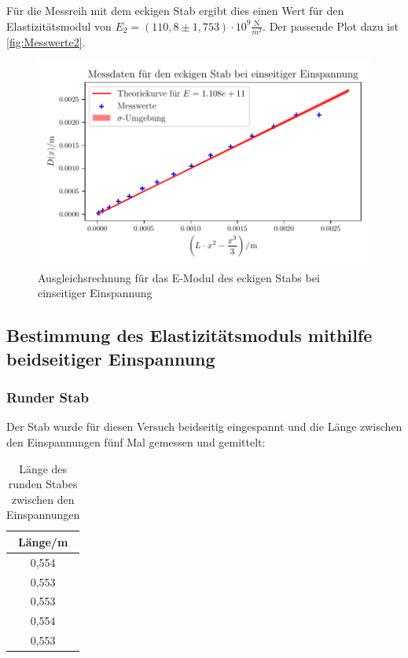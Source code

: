   Für die Messreih mit dem eckigen Stab ergibt dies einen Wert für den Elastizitätsmodul von $E_2 = (110{,}8 \pm 1{,}753) \cdot \mathrm{10^{9}} \frac{\mathrm{N}}{m^2}$. Der passende Plot dazu ist
  \autoref{fig:Messwerte2}.

  \begin{figure}
    \centering
    \includegraphics{build/plot3.pdf}
    \caption{Ausgleichsrechnung für das E-Modul des eckigen Stabs bei einseitiger Einspannung}
    \label{fig:Messwerte2}
  \end{figure}
  \newpage

\subsection{Bestimmung des Elastizitätsmoduls mithilfe beidseitiger Einspannung}

\subsubsection{Runder Stab}
  Der Stab wurde für diesen Versuch beidseitig eingespannt und die Länge zwischen den Einspannungen fünf Mal gemessen und gemittelt:

  \begin{table}
    \centering
    \caption{Länge des runden Stabes zwischen den Einspannungen}
    \label{tab:beidseitig_runder_Laenge}
    \begin{tabular}{c}
      \toprule
      Länge/m \\
      \midrule
      0,554 \\
      0,553 \\
      0,553 \\
      0,554 \\
      0,553 \\
      \bottomrule
    \end{tabular}
  \end{table}

